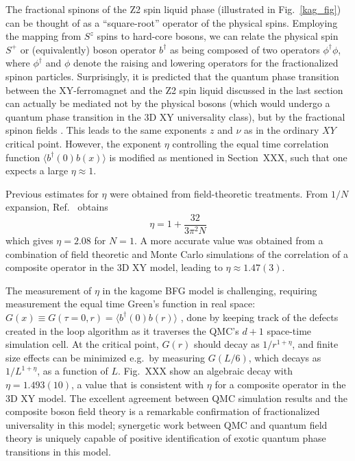 \documentclass[range]{ar2e}
\begin{document}
The fractional spinons of the Z2 spin liquid phase (illustrated in Fig.~\ref{kag_fig}) can be thought of as a ``square-root'' operator of the physical spins.  Employing the mapping from $S^z$ spins to hard-core bosons, we can relate the physical spin $S^+$ or (equivalently) boson operator $b^{\dagger}$ as being composed of two operators  $\phi^\dagger \phi$, where $\phi^\dagger$ and $\phi$ denote the raising and lowering operators for the fractionalized spinon particles.  
Surprisingly, it is predicted that the quantum phase transition between the XY-ferromagnet and the Z2 spin liquid discussed in the last section can actually be mediated not by the physical bosons (which would undergo a quantum phase transition in the 3D XY universality class), but by the fractional spinon fields \cite{XYstar1,XYstar2,earlyXYstar}.  This leads to the same exponents $z$ and $\nu$ as in the ordinary $XY$ critical point.  However, the exponent $\eta$ controlling the equal time correlation function $\langle b^\dagger(0) b(x) \rangle$ is modified as mentioned in Section~XXX, such that one expects a large $\eta \approx 1$.

Previous estimates for $\eta$ were obtained from field-theoretic treatments.  From $1/N$ expansion, Ref.~\cite{XYstar2} obtains
\begin{equation}
\eta = 1 + \frac{32}{3 \pi^2 N}
\end{equation}
which gives $\eta = 2.08$ for $N=1$.
A more accurate value was obtained from a combination of field theoretic and Monte Carlo simulations of the correlation of a composite operator in the 3D XY model\cite{compositefieldtheory,compositeMC}, leading to $\eta\approx  1.47(3)$.

The measurement of $\eta$ in the kagome BFG model is challenging, requiring measurement the equal time Green's function in real space: $G(x)\equiv G(\tau=0,r) = \langle b^\dagger(0) b(r) \rangle$ \cite{WormA,gfsse}, done by keeping track of the defects created in the loop algorithm \cite{Syljuasen02} as it traverses the QMC's $d+1$ space-time simulation cell.  At the critical point, $G(r)$ should decay as $1/r^{1+\eta}$, and finite size effects can be minimized e.g.~by measuring $G(L/6)$, which decays as $1/L^{1+\eta}$, as a function of $L$.  Fig.~XXX show an algebraic decay with $\eta=1.493(10)$, a value that is consistent with $\eta$ for a composite operator in the 3D XY model.  The excellent agreement between QMC simulation results and the composite boson field theory is a remarkable confirmation of fractionalized universality in this model; synergetic work between QMC and quantum field theory is uniquely capable of positive identification of exotic quantum phase transitions in this model.
\end{document}
